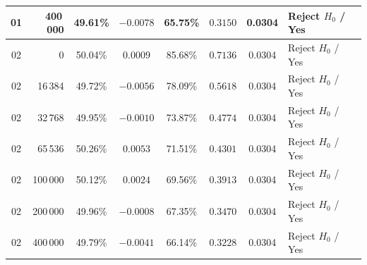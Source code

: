 \begin{table}[!t]
{\begin{tabular}{crcccccl}
01 & 400\,000 & 49.61\% & $-0.0078$ & 65.75\% & $0.3150$ & 0.0304 & Reject $H_0$ / Yes \\
\midrule
02 & 0 & 50.04\% & $0.0009$ & 85.68\% & $0.7136$ & 0.0304 & Reject $H_0$ / Yes \\
02 & 16\,384 & 49.72\% & $-0.0056$ & 78.09\% & $0.5618$ & 0.0304 & Reject $H_0$ / Yes \\
02 & 32\,768 & 49.95\% & $-0.0010$ & 73.87\% & $0.4774$ & 0.0304 & Reject $H_0$ / Yes \\
02 & 65\,536 & 50.26\% & $0.0053$ & 71.51\% & $0.4301$ & 0.0304 & Reject $H_0$ / Yes \\
02 & 100\,000 & 50.12\% & $0.0024$ & 69.56\% & $0.3913$ & 0.0304 & Reject $H_0$ / Yes \\
02 & 200\,000 & 49.96\% & $-0.0008$ & 67.35\% & $0.3470$ & 0.0304 & Reject $H_0$ / Yes \\
02 & 400\,000 & 49.79\% & $-0.0041$ & 66.14\% & $0.3228$ & 0.0304 & Reject $H_0$ / Yes \\
\bottomrule
\end{tabular}%
}
\end{table}
